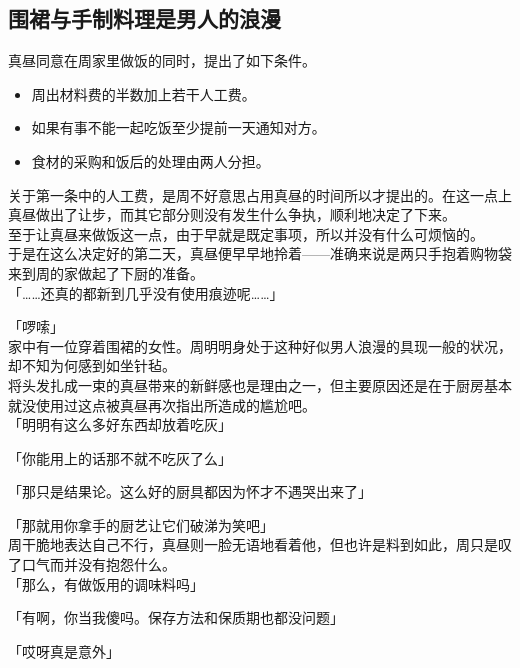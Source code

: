 \subsection{围裙与手制料理是男人的浪漫}

真昼同意在周家里做饭的同时，提出了如下条件。\\

\begin{itemize}
    \item 周出材料费的半数加上若干人工费。
    \item 如果有事不能一起吃饭至少提前一天通知对方。
    \item 食材的采购和饭后的处理由两人分担。
\end{itemize}

关于第一条中的人工费，是周不好意思占用真昼的时间所以才提出的。在这一点上真昼做出了让步，而其它部分则没有发生什么争执，顺利地决定了下来。\\

至于让真昼来做饭这一点，由于早就是既定事项，所以并没有什么可烦恼的。\\

于是在这么决定好的第二天，真昼便早早地拎着——准确来说是两只手抱着购物袋来到周的家做起了下厨的准备。\\

「……还真的都新到几乎没有使用痕迹呢……」

「啰嗦」\\

家中有一位穿着围裙的女性。周明明身处于这种好似男人浪漫的具现一般的状况，却不知为何感到如坐针毡。\\

将头发扎成一束的真昼带来的新鲜感也是理由之一，但主要原因还是在于厨房基本就没使用过这点被真昼再次指出所造成的尴尬吧。\\

「明明有这么多好东西却放着吃灰」

「你能用上的话那不就不吃灰了么」

「那只是结果论。这么好的厨具都因为怀才不遇哭出来了」

「那就用你拿手的厨艺让它们破涕为笑吧」\\

周干脆地表达自己不行，真昼则一脸无语地看着他，但也许是料到如此，周只是叹了口气而并没有抱怨什么。\\

「那么，有做饭用的调味料吗」

「有啊，你当我傻吗。保存方法和保质期也都没问题」

「哎呀真是意外」

